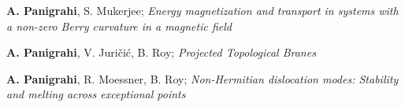 \begin{cventries}
{\begin{cvitems}
	  	\item{\textbf{A. Panigrahi}, S. Mukerjee; \textit{Energy magnetization and transport in systems with a non-zero Berry curvature in a magnetic field}
	  	}
	  	\item{\textbf{A. Panigrahi}, V. Juri\v{c}i\'c, B. Roy; \textit{Projected Topological Branes}}
      	\item{\textbf{A. Panigrahi}, R. Moessner, B. Roy; \textit{Non-Hermitian dislocation modes: Stability and melting across exceptional points} }
      \end{cvitems}
    }


\end{cventries}
